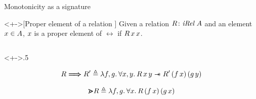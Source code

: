 \documentclass[aspectratio=169]{beamer}
\begin{document}
\begin{frame}{Monotonicity as a signature}
    \begin{definition}<+->[Proper element of a relation \parencite{sozeauNewLookGeneralized2009}]
        Given a relation $R\colon\textit{iRel}\ A$ and an element $x\in A$, $x$ is a proper element of $\rel$ if $R\, x\, x$.
    \end{definition}
    \begin{columns}
        \begin{column}<+->{.5\textwidth}
            \begin{definition}
                \vspace*{-.5cm}
                \begin{align*}
                    \rel \respect \rel' \eqdef \Lam \func, \funcB. \All \var,\varB. \rel\, \var\, \varB \wand \rel'\, (\func\, \var)\, (\funcB\, \varB)
                \end{align*}
            \end{definition}

            \begin{definition}
                \vspace*{-.5cm}
                \begin{align*}
                    \point \rel \eqdef \Lam \func, \funcB. \All \var. \rel\, (\func\, \var)\, (\funcB\, \var)
                \end{align*}
            \end{definition}


\end{column}
\end{columns}
\end{frame}
\end{document}
